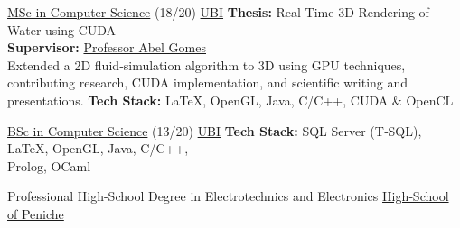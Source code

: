 \documentclass[
	a4paper,
]{fortysecondscv}
\begin{document}
\begin{cvtable}[3]
        {\textcolor{cvsectioncolor}{\href{https://www.di.ubi.pt/Cursos/mei/}{MSc in Computer Science}} (18/20)}
        {\textcolor{cvsectioncolor}{\href{https://www.ubi.pt/}{UBI}}}
        {
            \textbf{Thesis:} Real-Time 3D Rendering of Water using CUDA\\
            \textbf{Supervisor:} \textcolor{cvsectioncolor}{\href{http://www.di.ubi.pt/~agomes/}{Professor Abel Gomes}}\\
            Extended a 2D fluid‑simulation algorithm to 3D using GPU techniques, contributing research, CUDA implementation, and scientific writing and presentations.
            \newline \textbf{Tech Stack:}
            {\color{sklimegreen}LaTeX},
            {\color{skyellow}OpenGL},
            {\color{skyellow}Java},
            {\color{skorange}C/C++},
            {\color{skorange}CUDA \& OpenCL}
        }

        {\textcolor{cvsectioncolor}{\href{https://www.di.ubi.pt/Cursos/lei/}{BSc in Computer Science}} (13/20)}
        {\textcolor{cvsectioncolor}{\href{https://www.ubi.pt/}{UBI}}}
        {
            \newline \textbf{Tech Stack:}
            {\color{sklimegreen}SQL Server (T‑SQL)}, 
            {\color{sklimegreen}LaTeX},
            {\color{skyellow}OpenGL},
            {\color{skyellow}Java},
            {\color{skorange}C/C++},\\
            {\color{skorange}Prolog},
            {\color{skorange}OCaml}
        }

        {Professional High-School Degree in Electrotechnics and Electronics}
        {\textcolor{cvsectioncolor}{\href{https://site.espeniche.pt/}{High‑School of Peniche}}}
        {\vspace{0.5cm}}

\end{cvtable}
\end{document}
